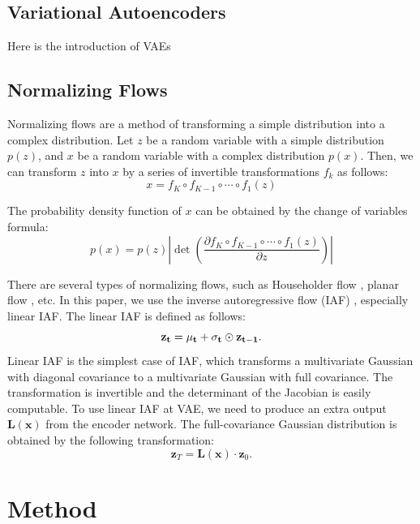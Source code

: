 \documentclass[10pt]{article}
\begin{document}
\subsection{Variational Autoencoders}

Here is the introduction of VAEs

\subsection{Normalizing Flows}

Normalizing flows are a method of transforming a simple distribution into a complex distribution. \cite{rezende15normalizingflows} Let $z$ be a random variable with a simple distribution $p(z)$, and $x$ be a random variable with a complex distribution $p(x)$. Then, we can transform $z$ into $x$ by a series of invertible transformations $f_k$ as follows:
\begin{equation}
    x = f_K \circ f_{K-1} \circ \cdots \circ f_1(z)
\end{equation}

The probability density function of $x$ can be obtained by the change of variables formula:
\begin{equation}
    p(x) = p(z) \left| \det \left( \frac{\partial f_K \circ f_{K-1} \circ \cdots \circ f_1(z)}{\partial z} \right) \right|
\end{equation}

There are several types of normalizing flows, such as Householder flow \cite{tomczak2017householder}, planar flow \cite{rezende15normalizingflows}, etc. In this paper, we use the inverse autoregressive flow (IAF) \cite{kingma2016iaf}, especially linear IAF. The linear IAF is defined as follows:
\begin{equation}
    \bf z_t = \bf \mu_t + \bf \sigma_t \odot \bf z_{t-1}.
\end{equation}
Linear IAF is the simplest case of IAF, which transforms a multivariate Gaussian with diagonal covariance to a multivariate Gaussian with full covariance. The transformation is invertible and the determinant of the Jacobian is easily computable. To use linear IAF at VAE, we need to produce an extra output $\mathbf{L(x)}$ from the encoder network. The full-covariance Gaussian distribution is obtained by the following transformation:
\begin{equation}
    \mathbf{z}_T = \mathbf{L(x)} \cdot \mathbf{z}_0.
\end{equation}


\section{Method}
\end{document}

